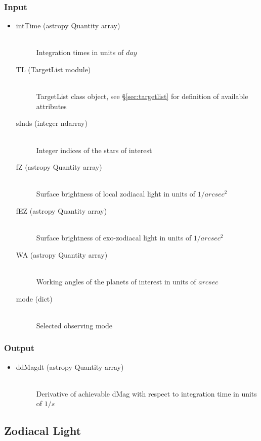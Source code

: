 \documentclass[cleanfoot]{asme2ej}
\begin{document}
\subsubsection*{Input}
\begin{itemize}
\item 
\begin{description}
    \item[intTime (astropy Quantity array)] \hfill \\ Integration times in units of $ day $
    \item[TL (TargetList module)] \hfill \\ TargetList class object, see \S\ref{sec:targetlist} for definition of available attributes
    \item[sInds (integer ndarray)] \hfill \\ Integer indices of the stars of interest
    \item[fZ (astropy Quantity array)] \hfill \\ Surface brightness of local zodiacal light in units of $ 1/arcsec^2 $
    \item[fEZ (astropy Quantity array)] \hfill \\ Surface brightness of exo-zodiacal light in units of $ 1/arcsec^2 $
    \item[WA (astropy Quantity array)] \hfill \\ Working angles of the planets of interest in units of $ arcsec $
    \item[mode (dict)] \hfill \\ Selected observing mode
\end{description}
\end{itemize}

\subsubsection*{Output}
\begin{itemize}
\item 
\begin{description}
    \item[ddMagdt (astropy Quantity array)] \hfill \\ Derivative of achievable dMag with respect to integration time in units of $ 1/s $
\end{description}
\end{itemize}



\subsection{Zodiacal Light}\label{sec:zodiacallight}
\end{document}
